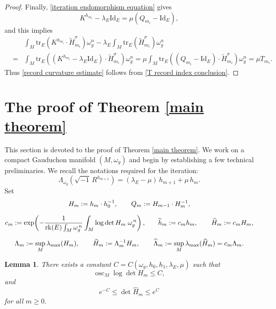 \documentclass[12pt, reqno]{amsart}
\newcommand{\id}{\mathrm{Id}}
\newcommand{\rk}{{\rm rk}}
\theoremstyle{plain}
\newtheorem{lemma}[thm]{Lemma}
\theoremstyle{definition}
\newcommand{\blemma}{\begin{lemma}}
\newcommand{\elemma}{\end{lemma}}
\newcommand{\beq}{\begin{equation}}
\newcommand{\eeq}{\end{equation}}
\newcommand{\be}{\begin{eqnarray*}}
\newcommand{\ee}{\end{eqnarray*}}
\renewcommand{\hat}{\widehat}
\renewcommand{\tilde}{\widetilde}
\renewcommand{\>}{\rightarrow}
\newcommand{\om}{\omega}
\newcommand{\tr}{\mathrm{tr}}
\numberwithin{equation}{section}
\begin{document}
\begin{proof}
	Finally, \eqref{iteration endomorphism equation} gives
	\beq 
	K^{h_{m_i}}-\lambda_E\id_E=\mu(Q_{m_i}-\id_E),
\eeq 
and this implies
	\be 
	&&\int_M\tr_E\left(K^{h_{m_i}}\cdot\tilde H_{m_i}^\sigma\right)\omega_g^n
	-\lambda_E\int_M\tr_E\left(\tilde H_{m_i}^\sigma\right)\omega_g^n\nonumber\\
	&=&\int_M\tr_E\left((K^{h_{m_i}}-\lambda_E\id_E)\cdot
	\tilde H_{m_i}^\sigma\right)\omega_g^n
	=\mu\int_M\tr_E\left((Q_{m_i}-\id_E)\cdot
	\tilde H_{m_i}^\sigma\right)\omega_g^n
	=\mu T_{m_i}.
	\ee
	Thus \eqref{record curvature estimate} follows from \eqref{T record index conclusion}.
\end{proof}



\baselineskip

\section{The proof of Theorem \ref{main theorem}}

This section is devoted to the proof of Theorem \ref{main theorem}. We work on a compact Gauduchon manifold  $(M,\omega_g)$ and begin by establishing a few technical preliminaries.
We recall the notations required for the iteration:
\begin{equation}\label{iteration eq recall}
\Lambda_{\omega_g}\!\left(\sqrt{-1}\,R^{h_{m+1}}\right)
= (\lambda_E-\mu)\,h_{m+1}+\mu\,h_m.
\end{equation}
Set
\begin{gather}
H_m := h_m\cdot h_0^{-1},
\qquad
Q_m := H_{m-1}\cdot H_m^{-1},
\label{C0 H Q recall}
\\[6pt]
c_m :=
\exp\!\left(
-\frac{1}{\rk(E)\int_M\omega_g^{\,n}}
\int_M\log\det H_m\;\omega_g^{\,n}
\right),\!
\qquad
\hat{h}_m := c_m h_m,
\qquad
\hat{H}_m := c_m H_m,
\label{C0 normalization recall}
\\[6pt]
\Lambda_m := \sup_M\lambda_{\max}(H_m),
\qquad
\tilde{H}_m := \Lambda_m^{-1}H_m,
\qquad
\hat{\Lambda}_m := \sup_M\lambda_{\max}(\hat{H}_m)
= c_m\Lambda_m.
\label{C0 Lambda recall}
\end{gather}
\blemma\label{determinant oscillation lemma}
There exists a constant
$C=C(\om_g,h_0,h_1,\lambda_E,\mu)$ such that
\begin{equation}
\operatorname{osc}_M\log\det H_m\leq C,
\label{determinant oscillation}
\end{equation}
and
\begin{equation}
e^{-C}\leq\det\hat H_m\leq e^{C}
\label{normalized determinant pointwise}
\end{equation}
for all $m\geq0$.  
\elemma
\end{document}
